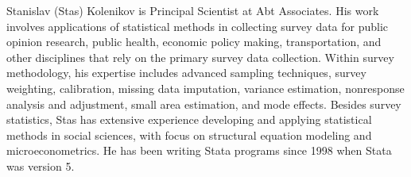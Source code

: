 \begin{aboutauthor}
  Stanislav (Stas) Kolenikov is Principal Scientist at Abt Associates.
  His work involves applications of statistical methods 
  in collecting survey data
  for public opinion research, public health, economic policy making, 
  transportation, and other disciplines
  that rely on the primary survey data collection.
  Within survey methodology, his expertise includes advanced sampling techniques,
  survey weighting, calibration, missing data imputation, variance estimation,
  nonresponse analysis and adjustment, small area estimation, and mode effects.
  Besides survey statistics, Stas has extensive experience developing and applying
  statistical methods in social sciences, with focus on structural equation
  modeling and microeconometrics. He has been writing Stata programs since
  1998 when Stata was version 5.
\end{aboutauthor}
